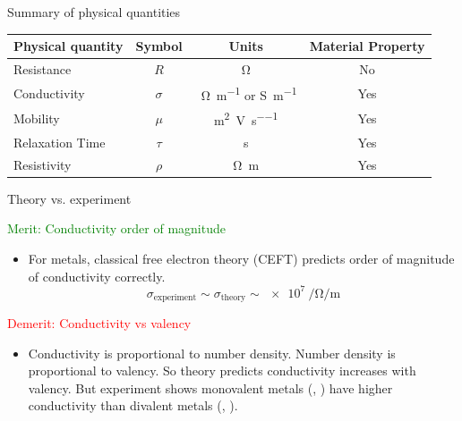 %
\begin{frame}{Summary of physical quantities}
	\begin{table}
		\centering
		\begin{tabular}{l c c c}
			\toprule
			Physical quantity	&	Symbol	& Units	& Material Property	\\
			\midrule
			Resistance	&	\(R\)	&	\si{\ohm}	&	No	\\
			Conductivity	& \(\sigma\)	&	\si{\per\ohm\per\metre} or \si{\siemens\per\metre}	&	Yes	\\
			Mobility	&	\(\mu\)	&	\si{\metre\squared\per\volt\per\second}	&	Yes 	\\
			Relaxation Time	&	\(\tau\)	&	\si{\second}	& Yes	\\
			Resistivity	&	\(\rho\)	&	\si{\ohm\metre}	&	Yes	\\
			\bottomrule
		\end{tabular}
	\end{table}
\end{frame}
%
\begin{frame}{Theory vs. experiment}
	\begin{block}{\textcolor{green}{Merit: Conductivity order of magnitude}}
		\begin{itemize}
			\item For metals, classical free electron theory (CEFT) predicts order of magnitude of conductivity correctly.  
			\[\sigma_{\mathrm{experiment}} \sim \sigma_{\mathrm{theory}} \sim \SI{e7}{\per\ohm\per\metre} \]
		\end{itemize}
	\end{block}
	\begin{block}{\textcolor{red}{Demerit: Conductivity vs valency}}
		\begin{itemize}
			\item Conductivity is proportional to number density. Number density is proportional to valency. So theory predicts conductivity increases with valency. But experiment shows monovalent metals (, ) have higher conductivity than divalent metals (, ).
		\end{itemize}
	\end{block}
\end{frame}
%
